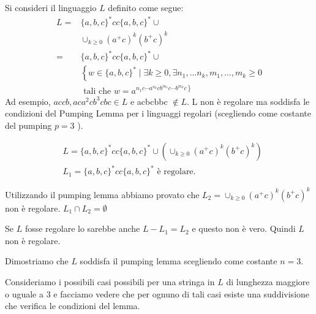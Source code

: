 Si consideri il linguaggio $L$ definito come segue:
$$
\begin{aligned}
L=&\{a, b, c\}^{*} c c\{a, b, c\}^{*} \cup \\
& \cup_{k \geq 0}\left(a^{+} c\right)^{k}\left(b^{+} c\right)^{k} \\
=&\{a, b, c\}^{*} c c\{a, b, c\}^{*} \cup \\
&\left\{w \in\{a, b, c\}^{*} \mid \exists k \geq 0, \exists n_{1}, \ldots n_{k}, m_{1}, \ldots, m_{k} \geq 0\right.\\
& \text { tali che } w=a^{\left.n_{1} c \cdots a^{n_{k}} c b^{m_{1}} c \cdots b^{m_{k}} c\right\}}
\end{aligned}
$$
Ad esempio, $a c c b, a c a^{2} c b^{3} c b c \in L$ e acbcbbc $\notin L$. L non è regolare ma soddisfa le condizioni del Pumping Lemma per i linguaggi regolari (scegliendo come costante del pumping $p=3$ ).

\vspace{5mm}

$$
\begin{aligned}
&L=\{a, b, c\}^{*} c c\{a, b, c\}^{*} \cup\left(\cup_{k \geq 0}\left(a^{+} c\right)^{k}\left(b^{+} c\right)^{k}\right) \\
&L_{1}=\{a, b, c\}^{*} c c\{a, b, c\}^{*} \text { è regolare. }
\end{aligned}
$$

Utilizzando il pumping lemma abbiamo provato che $L_{2}=\cup_{k \geq 0}\left(a^{+} c\right)^{k}\left(b^{+} c\right)^{k}$ non è regolare.
$L_{1} \cap L_{2}=\emptyset$

Se $L$ fosse regolare lo sarebbe anche $L-L_{1}=L_{2}$ e questo non è vero. Quindi $L$ non è regolare.

Dimostriamo che $L$ soddisfa il pumping lemma scegliendo come costante $n=3$.

Consideriamo i possibili casi possibili per una stringa in $L$ di lunghezza maggiore o uguale a 3 e facciamo vedere che per ognuno di tali casi esiste una suddivisione che verifica le condizioni del lemma.

